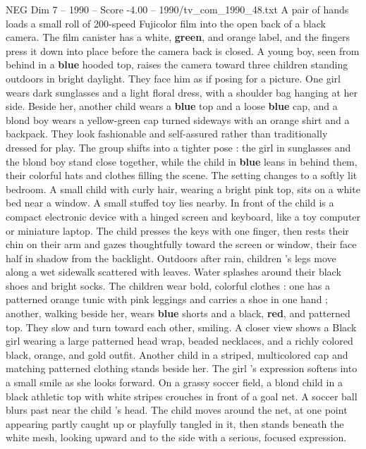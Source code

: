 \begin{textsample}{NEG Dim 7 – 1990 – Score -4.00 – 1990/tv\_com\_1990\_48.txt}  \label{ex:f7_neg_038}
A pair of hands loads a small roll of 200-speed Fujicolor film into the open back of a black camera.
The film canister has a white, \textbf{green}, and orange label, and the fingers press it down into place before the camera back is closed.
A young boy, seen from behind in a \textbf{blue} hooded top, raises the camera toward three children standing outdoors in bright daylight.
They face him as if posing for a picture.
One girl wears dark sunglasses and a light floral dress, with a shoulder bag hanging at her side.
Beside her, another child wears a \textbf{blue} top and a loose \textbf{blue} cap, and a blond boy wears a yellow-green cap turned sideways with an orange shirt and a backpack.
They look fashionable and self-assured rather than traditionally dressed for play.
The group shifts into a tighter pose : the girl in sunglasses and the blond boy stand close together, while the child in \textbf{blue} leans in behind them, their colorful hats and clothes filling the scene.
The setting changes to a softly lit bedroom.
A small child with curly hair, wearing a bright pink top, sits on a white bed near a window.
A small stuffed toy lies nearby.
In front of the child is a compact electronic device with a hinged screen and keyboard, like a toy computer or miniature laptop.
The child presses the keys with one finger, then rests their chin on their arm and gazes thoughtfully toward the screen or window, their face half in shadow from the backlight.
Outdoors after rain, children ’s legs move along a wet sidewalk scattered with leaves.
Water splashes around their black shoes and bright socks.
The children wear bold, colorful clothes : one has a patterned orange tunic with pink leggings and carries a shoe in one hand ; another, walking beside her, wears \textbf{blue} shorts and a black, \textbf{red}, and patterned top.
They slow and turn toward each other, smiling.
A closer view shows a Black girl wearing a large patterned head wrap, beaded necklaces, and a richly colored black, orange, and gold outfit.
Another child in a striped, multicolored cap and matching patterned clothing stands beside her.
The girl ’s expression softens into a small smile as she looks forward.
On a grassy soccer field, a blond child in a black athletic top with white stripes crouches in front of a goal net.
A soccer ball blurs past near the child ’s head.
The child moves around the net, at one point appearing partly caught up or playfully tangled in it, then stands beneath the white mesh, looking upward and to the side with a serious, focused expression.

\end{textsample}
